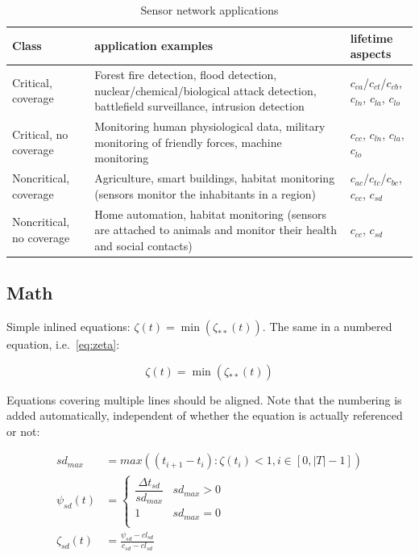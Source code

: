 \begin{table}
	\centering
	\begin{tabular}{>{\raggedright}p{1.8cm}p{5.4cm}p{3.4cm}}
		\toprule
		Class & application examples & lifetime aspects \\
		\midrule
		Critical, coverage & 
				Forest fire detection, flood detection, nuclear/chemical/biological attack detection, battlefield surveillance, intrusion detection & 
				$c_{ca}$/$c_{ct}$/$c_{cb}$, $c_{ln}$, $c_{la}$, $c_{lo}$\\
		Critical, no coverage & 
				Monitoring human physiological data, military monitoring of friendly forces, machine monitoring & 
				$c_{cc}$, $c_{ln}$, $c_{la}$, $c_{lo}$ \\
		Noncritical, coverage & 
				Agriculture, smart buildings, habitat monitoring (sensors monitor the inhabitants in a region) & 
				$c_{ac}$/$c_{tc}$/$c_{bc}$, $c_{cc}$, $c_{sd}$ \\
		Noncritical, no coverage & 
				Home automation, habitat monitoring (sensors are attached to animals and monitor their health and social contacts) & 
				$c_{cc}$, $c_{sd}$ 	\\
		\bottomrule
	\end{tabular}
	\caption{Sensor network applications}
	\label{tab:SensorNetworkApplications}
\end{table}


\subsection{Math}

Simple inlined equations: $\zeta(t) = \min( \zeta_{**}(t))$.
The same in a numbered equation, i.e.\ \cref{eq:zeta}:

\begin{equation}
\zeta(t) = \min( \zeta_{**}(t))
\label{eq:zeta}
\end{equation}

Equations covering multiple lines should be aligned. Note that the numbering is added automatically, independent of whether the equation is actually referenced or not:

\begin{align}
sd_{max} &= max((t_{i+1} - t_i) : \zeta(t_i) < 1, i \in [0, |T|-1]) \\
\psi_{sd}(t) &= \left\{ \begin{array}{cl}
\dfrac{\Delta t_{sd}}{sd_{max}} & sd_{max} > 0 \\
1 & sd_{max} = 0 \\
\end{array} \right.\\
\zeta_{sd}(t) &= \frac{\psi_{sd} - cl_{sd}}{c_{sd} - cl_{sd}}
\end{align}



